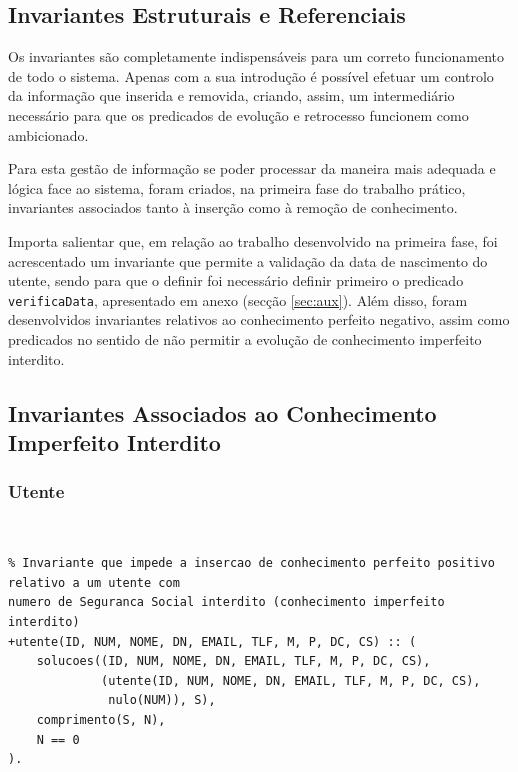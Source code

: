 \documentclass[a4paper, 11pt]{article}
\begin{document}
\subsection{Invariantes Estruturais e Referenciais}

Os invariantes são completamente indispensáveis para um correto funcionamento
de todo o sistema. Apenas com a sua introdução é possível efetuar um controlo da informação 
que inserida e removida, criando,
assim, um intermediário necessário para que os predicados de evolução e retrocesso funcionem 
como ambicionado.

Para esta gestão de informação se poder processar da maneira mais adequada e lógica face ao 
sistema, foram criados, na primeira fase do trabalho prático, invariantes
associados tanto à inserção como à remoção de conhecimento.

Importa salientar que, em relação ao trabalho desenvolvido na primeira fase, foi acrescentado um 
invariante que permite a validação da data de nascimento do utente, sendo para que o definir foi 
necessário definir primeiro o predicado \texttt{verificaData}, apresentado em anexo (secção 
\ref{sec:aux}). Além disso, foram desenvolvidos invariantes relativos ao conhecimento perfeito 
negativo, assim como predicados no sentido de não permitir a evolução de conhecimento imperfeito 
interdito.



\subsection{Invariantes Associados ao Conhecimento Imperfeito Interdito}
\label{sec:inv_interdito}

\subsubsection*{Utente}

\

\begin{lstlisting}
% Invariante que impede a insercao de conhecimento perfeito positivo relativo a um utente com 
numero de Seguranca Social interdito (conhecimento imperfeito interdito)
+utente(ID, NUM, NOME, DN, EMAIL, TLF, M, P, DC, CS) :: (
    solucoes((ID, NUM, NOME, DN, EMAIL, TLF, M, P, DC, CS),
             (utente(ID, NUM, NOME, DN, EMAIL, TLF, M, P, DC, CS),
              nulo(NUM)), S),
    comprimento(S, N),
    N == 0
).
\end{lstlisting}
\end{document}
